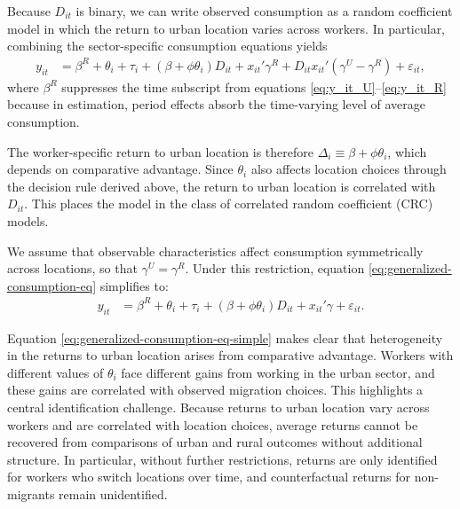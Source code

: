 \documentclass[12pt]{article}
\begin{document}
Because $D_{it}$ is binary, we can write observed consumption as a random coefficient model in which the return to urban location varies across workers.
In particular, combining the sector-specific consumption equations yields
\begin{align}
    y_{it}&=\beta^R+\theta_i + \tau_i +(\beta+\phi \theta_i)D_{it}+  x_{it}'\gamma^R + D_{it}x_{it}'(\gamma^U-\gamma^R) + \varepsilon_{it},\label{eq:generalized-consumption-eq}
\end{align}
\noindent where $\beta^R$ suppresses the time subscript from equations \eqref{eq:y_it_U}--\eqref{eq:y_it_R} because in estimation, period effects absorb the time-varying level of average consumption.

The worker-specific return to urban location is therefore $\Delta_i \equiv \beta + \phi\theta_{i}$, which depends on comparative advantage.
Since $\theta_{i}$ also affects location choices through the decision rule derived above, the return to urban location is correlated with $D_{it}$.
This places the model in the class of correlated random coefficient (CRC) models.



We assume that observable characteristics affect consumption symmetrically across locations, so that $\gamma^U=\gamma^R$.
Under this restriction, equation \eqref{eq:generalized-consumption-eq} simplifies to: 
\begin{align}
    y_{it}&=\beta^R+\theta_i + \tau_i +(\beta+\phi \theta_i)D_{it}+  x_{it}'\gamma + \varepsilon_{it}.\tag{10$'$}\label{eq:generalized-consumption-eq-simple}
\end{align}

Equation \eqref{eq:generalized-consumption-eq-simple} makes clear that heterogeneity in the returns to urban location arises from comparative advantage. 
Workers with different values of $\theta_{i}$ face different gains from working in the urban sector, and these gains are correlated with observed migration choices. 
This highlights a central identification challenge.
Because returns to urban location vary across workers and are correlated with location choices, average returns cannot be recovered from comparisons of urban and rural outcomes without additional structure.
In particular, without further restrictions, returns are only identified for workers who switch locations over time, and counterfactual returns for non-migrants remain unidentified.
\end{document}
